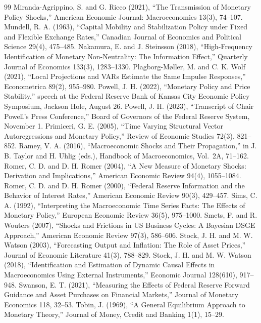 \documentclass[11pt]{article}
\begin{document}
\begin{thebibliography}{99}
 Miranda-Agrippino, S. and G. Ricco (2021), ``The Transmission of Monetary Policy Shocks,'' American Economic Journal: Macroeconomics 13(3), 74--107.
 Mundell, R. A. (1963), ``Capital Mobility and Stabilization Policy under Fixed and Flexible Exchange Rates,'' Canadian Journal of Economics and Political Science 29(4), 475--485.
 Nakamura, E. and J. Steinsson (2018), ``High-Frequency Identification of Monetary Non-Neutrality: The Information Effect,'' Quarterly Journal of Economics 133(3), 1283--1330.
 Plagborg-M{\o}ller, M. and C. K. Wolf (2021), ``Local Projections and VARs Estimate the Same Impulse Responses,'' Econometrica 89(2), 955--980.
 Powell, J. H. (2022), ``Monetary Policy and Price Stability,'' speech at the Federal Reserve Bank of Kansas City Economic Policy Symposium, Jackson Hole, August 26.
 Powell, J. H. (2023), ``Transcript of Chair Powell's Press Conference,'' Board of Governors of the Federal Reserve System, November 1.
 Primiceri, G. E. (2005), ``Time Varying Structural Vector Autoregressions and Monetary Policy,'' Review of Economic Studies 72(3), 821--852.
 Ramey, V. A. (2016), ``Macroeconomic Shocks and Their Propagation,'' in J. B. Taylor and H. Uhlig (eds.), Handbook of Macroeconomics, Vol.\ 2A, 71--162.
 Romer, C. D. and D. H. Romer (2004), ``A New Measure of Monetary Shocks: Derivation and Implications,'' American Economic Review 94(4), 1055--1084.
 Romer, C. D. and D. H. Romer (2000), ``Federal Reserve Information and the Behavior of Interest Rates,'' American Economic Review 90(3), 429--457.
 Sims, C. A. (1992), ``Interpreting the Macroeconomic Time Series Facts: The Effects of Monetary Policy,'' European Economic Review 36(5), 975--1000.
 Smets, F. and R. Wouters (2007), ``Shocks and Frictions in US Business Cycles: A Bayesian DSGE Approach,'' American Economic Review 97(3), 586--606.
 Stock, J. H. and M. W. Watson (2003), ``Forecasting Output and Inflation: The Role of Asset Prices,'' Journal of Economic Literature 41(3), 788--829.
 Stock, J. H. and M. W. Watson (2018), ``Identification and Estimation of Dynamic Causal Effects in Macroeconomics Using External Instruments,'' Economic Journal 128(610), 917--948.
 Swanson, E. T. (2021), ``Measuring the Effects of Federal Reserve Forward Guidance and Asset Purchases on Financial Markets,'' Journal of Monetary Economics 118, 32--53.
 Tobin, J. (1969), ``A General Equilibrium Approach to Monetary Theory,'' Journal of Money, Credit and Banking 1(1), 15--29.
\end{thebibliography}
\appendix
\renewcommand{\thetable}{A\arabic{table}}\setcounter{table}{0}
\end{document}
